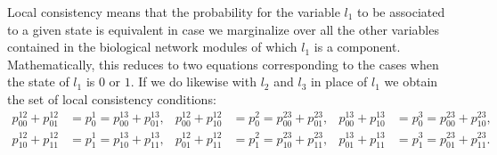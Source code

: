 Local consistency means that the probability for the variable $l_1$ to be associated to a given state is equivalent in case we marginalize over all the other variables contained in the biological network modules of which $l_1$ is a component.  Mathematically, this reduces to two equations corresponding to the cases when the state of $l_1$ is $0$ or $1$. If we do likewise with $l_2$ and $l_3$ in place of $l_1$ we obtain the set of local consistency conditions:
\begin{equation}
\begin{aligned}\label{eq:localconsistencythreegenes}
 p^{12}_{00} + p^{12}_{01} &= p^{1}_0 = p^{13}_{00} + p^{13}_{01}, &
 p^{12}_{00} + p^{12}_{10} &= p^{2}_0 = p^{23}_{00} + p^{23}_{01}, &
 p^{13}_{00} + p^{13}_{10} &= p^{3}_0 = p^{23}_{00} + p^{23}_{10},\\
 p^{12}_{10} + p^{12}_{11} &= p^{1}_1 = p^{13}_{10} + p^{13}_{11}, &
 p^{12}_{01} + p^{12}_{11} &= p^{2}_1 = p^{23}_{10} + p^{23}_{11}, &
 p^{13}_{01} + p^{13}_{11} &= p^{3}_1 = p^{23}_{01} + p^{23}_{11}.
 \end{aligned}
 \end{equation}
